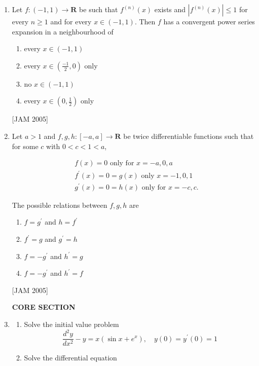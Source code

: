 \begin{enumerate}
 
 
 
 \item Let $f:(-1,1) \longrightarrow \boldsymbol{R}$ be such that $f^{(n)}(x)$ exists and $\left|f^{(n)}(x)\right| \leq 1$ for every $n \geq 1$ and for every $x \in(-1,1)$. Then $f$ has a convergent power series expansion in a neighbourhood of
\begin{enumerate} 
    \item every $x \in(-1,1)$
    \item every $x \in\left(\frac{-1}{2}, 0\right)$ only
    \item no $x \in(-1,1)$
    \item every $x \in\left(0, \frac{1}{2}\right)$ only
\end{enumerate}
 \hfill [JAM 2005]
 
 
 
 
 \item  Let $a>1$ and $f, g, h:[-a, a] \longrightarrow \boldsymbol{R}$ be twice differentiable functions such that for some $c$ with $0<c<1<a$,

$$
\begin{aligned}
&f(x)=0 \text { only for } x=-a, 0, a \\
&f^{\prime}(x)=0=g(x) \text { only } x=-1,0,1 \\
&g^{\prime}(x)=0=h(x) \text { only for } x=-c, c .
\end{aligned}
$$

The possible relations between $f, g, h$ are
\begin{enumerate} \item $f=g^{\prime}$ and $h=f^{\prime}$
    \item $f^{\prime}=g$ and $g^{\prime}=h$
    \item $f=-g^{\prime}$ and $h^{\prime}=g$
    \item $f=-g^{\prime}$ and $h^{\prime}=f$ 
\end{enumerate}
 \hfill [JAM 2005]



 
\begin{center}
\textbf{CORE SECTION}
\end{center}


 \item
 \begin{enumerate}
     \item Solve the initial value problem
    $$
     \frac{d^{2} y}{d x^{2}}-y=x\left(\sin x+e^{x}\right), \quad y(0)=y^{\prime}(0)=1
    $$
    
    \item Solve the differential equation


\end{enumerate}
\end{enumerate}
